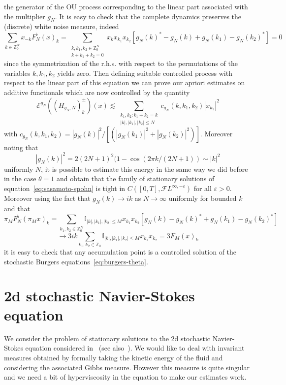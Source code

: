 \documentclass[11pt,a4paper,reqno]{amsart}
\newcommand{\II}{\mathbb{I}}
\newcommand{\ZZ}{\mathbb{Z}}
\newcommand{\cE}{\mathcal{E}}
\newcommand{\cF}{\mathcal{F}}
\newcommand{\eps}{\varepsilon}
\begin{document}
the generator of the OU process corresponding to the linear part associated with the multiplier $g_N$. It is easy to check that the complete dynamics preserves the (discrete) white noise measure, indeed
$$
\sum_{k\in\ZZ_0^N} x_{-k} F^\flat_N(x)_k = \sum_{\substack{k,k_1,k_2\in\ZZ_0^N\\k+k_1+k_2=0}}  x_{k}  x_{k_1} x_{k_2}[ g_N(k)^*-g_N(k)+g_N(k_1)-g_N(k_2)^*] =0
$$
since the symmetrization of the r.h.s. with respect to the permutations of the variables $k,k_1,k_2$ yields zero. Then defining suitable controlled process with respect to the linear part of this equation we can prove our apriori estimates on additive functionals which are now controlled by the quantity
$$
 \cE^{g_N}((H_{g_N,N})^\pm_k)(x)\lesssim     \sum_{\substack{k_1,k_2 :k_1+k_2=k\\|k|,|k_1|,|k_2|\le N}}c_{g_N}(k,k_1,k_2) |x_{k_2}|^2  
$$
with $c_{g_N}(k,k_1,k_2) = |g_N(k)|^2/[(|g_N(k_1)|^{2}+|g_N(k_2)|^{2})]$. Moreover noting that
$$
|g_N(k)|^2 = 2 (2N+1)^2(1-\cos(2\pi k/(2N+1)) \sim |k|^2
$$
uniformly  $N$, it is possible to estimate this energy in the same way we did before in the case $\theta=1$ and obtain  that the family of stationary solutions of equation~\eqref{eq:sasamoto-spohn} is tight in $C([0,T],\cF L^{\infty,-\eps})$ for all $\eps >0$. Moreover using the fact that $g_N(k) \to ik$ as $N\to \infty$ uniformly for bounded $k$ and that 
$$
\pi_M F^\flat_N(\pi_M x)_k = \sum_{k_1,k_2\in\ZZ^N_0} \II_{|k|,|k_1|,|k_2|\le M}  x_{k_1} x_{k_2}[ g_N(k)-g_N(k)^*+g_N(k_1)-g_N(k_2)^*]
$$
$$
\to 3 i k \sum_{k_1,k_2\in\ZZ_0} \II_{|k|,|k_1|,|k_2|\le M}  x_{k_1} x_{k_2} = 3 F_M(x)_k
$$
it is easy to check that any accumulation point is a controlled solution of the stochastic Burgers equations~\eqref{eq:burgers-theta}. 

\section{2d stochastic Navier-Stokes equation}
\label{sec:ns}

We consider the problem of stationary solutions to the 2d stochastic Navier-Stokes equation considered in~\cite{albeverio-cruzeiro} (see also~\cite{albeverio-ferrario}). We would like to deal with invariant measures obtained by formally taking the kinetic energy of the fluid and considering the associated Gibbs measure. However this measure is quite singular and we need a bit of hyperviscosity in the equation to make our estimates work.
 
\end{document}
